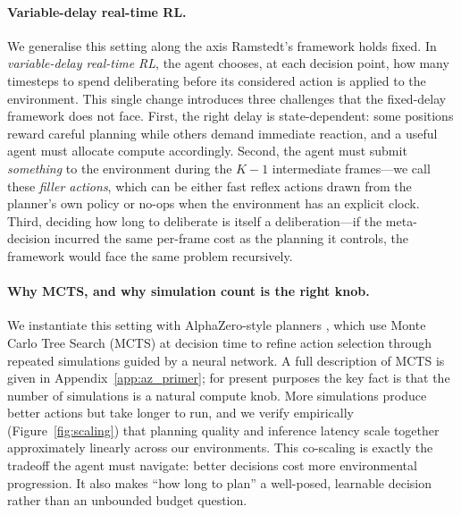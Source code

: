 \paragraph{Variable-delay real-time RL.}
We generalise this setting along the axis Ramstedt's framework holds fixed.
In \emph{variable-delay real-time RL}, the agent chooses, at each decision
point, how many timesteps to spend deliberating before its considered
action is applied to the environment.
This single change introduces three challenges that the fixed-delay
framework does not face.
First, the right delay is state-dependent: some positions reward careful
planning while others demand immediate reaction, and a useful agent must
allocate compute accordingly.
Second, the agent must submit \emph{something} to the environment during
the $K{-}1$ intermediate frames---we call these \emph{filler actions},
which can be either fast reflex actions drawn from the planner's own
policy or no-ops when the environment has an explicit clock.
Third, deciding how long to deliberate is itself a deliberation---if the
meta-decision incurred the same per-frame cost as the planning it controls,
the framework would face the same problem recursively.

\paragraph{Why MCTS, and why simulation count is the right knob.}
We instantiate this setting with AlphaZero-style planners
\citep{silver2018general}, which use Monte Carlo Tree Search (MCTS) at
decision time to refine action selection through repeated simulations
guided by a neural network.
A full description of MCTS is given in Appendix~\ref{app:az_primer}; for
present purposes the key fact is that the number of simulations is a
natural compute knob.
More simulations produce better actions but take longer to run, and we
verify empirically (Figure~\ref{fig:scaling}) that planning quality and
inference latency scale together approximately linearly across our
environments.
This co-scaling is exactly the tradeoff the agent must navigate: better
decisions cost more environmental progression.
It also makes ``how long to plan'' a well-posed, learnable decision
rather than an unbounded budget question.

